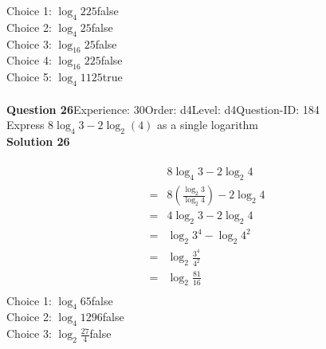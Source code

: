 \documentclass{article}
\begin{document}
Choice 1: \hspace{20pt}$\log_{4}225$\hspace{20pt}false\\
Choice 2: \hspace{20pt}$\log_{4}25$\hspace{20pt}false\\
Choice 3: \hspace{20pt}$\log_{16}25$\hspace{20pt}false\\
Choice 4: \hspace{20pt}$\log_{16}225$\hspace{20pt}false\\
Choice 5: \hspace{20pt}$\log_{4}1125$\hspace{20pt}true\\
\\[4pt]
\noindent\textbf{Question 26}\hspace{20pt}Experience: 30\hspace{20pt}Order: d4\hspace{20pt}Level: d4\hspace{20pt}Question-ID: 184\\[2pt]
Express $8\log_{4}3-2\log_{2}(4)$ as a single logarithm\\[4pt]
\noindent\textbf{Solution 26}\\[2pt]
\\[-35pt]\begin{align*}
&8\log_{4}3-2\log_{2}4\\[2pt]
=&8\left(\displaystyle\frac{\log_{2}3}{\log_{2}4}\right)-2\log_{2}4\\[2pt]
=&4\log_{2}3-2\log_{2}4\\[2pt]
=&\log_{2}3^4-\log_{2}4^2\\[2pt]
=&\log_{2}\displaystyle\frac{3^4}{4^2}\\[2pt]
=&\log_{2}\displaystyle\frac{81}{16}\\[-87pt]
\end{align*}
Choice 1: \hspace{20pt}$\log_{4}65$\hspace{20pt}false\\
Choice 2: \hspace{20pt}$\log_{4}1296$\hspace{20pt}false\\
Choice 3: \hspace{20pt}$\log_{2}\displaystyle\frac{27}{4}$\hspace{20pt}false\\
\end{document}
